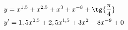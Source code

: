 \begin{ex}
\begin{align}
&y=x^{1,5}+x^{2,5}+x^3+x^{-8}+\tg{\frac{\pi}{4}}\nonumber\\
&y'=1,5x^{0,5}+2,5x^{1,5}+3x^2-8x^{-9}+0\nonumber
\end{align}
\end{ex}